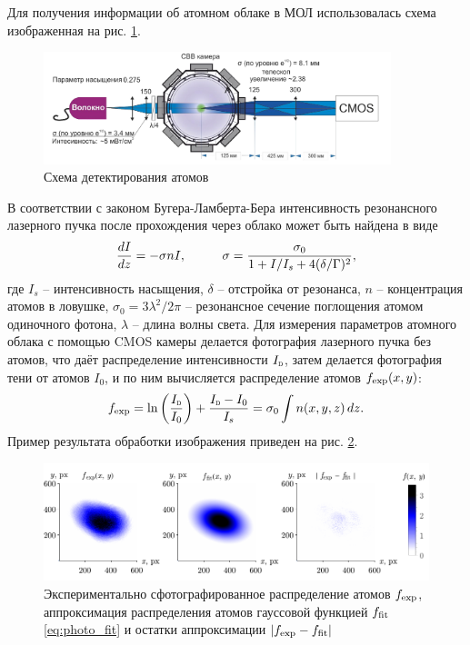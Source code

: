 Для получения информации об атомном облаке в МОЛ использовалась схема изображенная на рис. \ref{fig:exp_photo}. 

\begin{figure}[ht]
    \centering
    \includegraphics[width=0.9\textwidth]{figs/detect.png}
    \caption{Схема детектирования атомов \cite{vlad}}
    \label{fig:exp_photo}
\end{figure}


В соответствии с законом Бугера-Ламберта-Бера интенсивность резонансного лазерного пучка после прохождения через облако может быть найдена в виде
\begin{equation}
    \frac{d I}{d z} = - \sigma n I,
    \hspace{10 mm} 
    \sigma = \frac{\sigma_0}{1+I/I_s + 4 (\delta/\Gamma)^2},
    \label{eq:deltaG}
\end{equation}
где $I_s$ -- интенсивность насыщения, $\delta$ -- отстройка от резонанса, $n$ -- концентрация атомов в ловушке, $\sigma_0 = 3 \lambda^2 / 2\pi$ -- резонансное сечение поглощения атомом одиночного фотона, $\lambda$ -- длина волны света. Для измерения параметров атомного облака с помощью CMOS камеры делается фотография лазерного пучка без атомов, что даёт распределение интенсивности $\subt{I}{D}$, затем делается фотография тени от атомов $I_0$, и по ним вычисляется распределение атомов $f_{\textnormal{exp}}(x, y)$:
\begin{equation}
    \sub{f}{exp} = \ln\left(\frac{\subt{I}{D}}{I_0}\right) + \frac{\subt{I}{D} - I_0}{I_s} = \sigma_0 \int n(x, y, z) \d z.
\end{equation}
Пример результата обработки изображения приведен на рис. \ref{fig:fitmot}.

\begin{figure}[htb]
    \centering
    \includegraphics{figs/fit_mot_v2.pdf}
    \caption{Экспериментально сфотографированное распределение атомов $f_{\textnormal{exp}}$, аппроксимация распределения атомов гауссовой функцией $f_{\textnormal{fit}}$ \eqref{eq:photo_fit} и остатки аппроксимации $|f_{\textnormal{exp}} - f_{\textnormal{fit}}|$}
    \label{fig:fitmot}
\end{figure}

